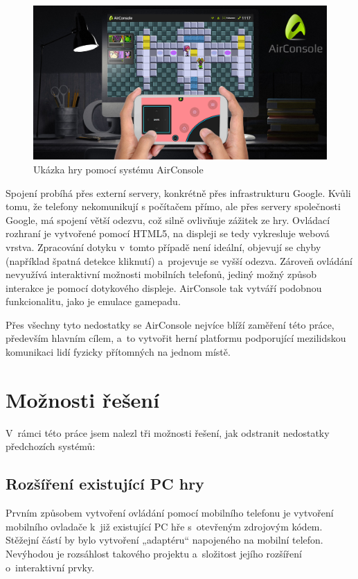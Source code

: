 \documentclass[thesis=B,czech,hidelinks]{FITthesis}[2012/06/26] %
\begin{document}
\begin{figure}[h]
\includegraphics[width=\textwidth]{airconsole}
\caption{Ukázka hry pomocí systému AirConsole\cite{airconsole}}
\end{figure}

Spojení probíhá přes externí servery, konkrétně přes infrastrukturu Google\cite{airconsole}. Kvůli tomu, že telefony nekomunikují s počítačem přímo, ale přes servery společnosti Google, má spojení větší odezvu, což silně ovlivňuje zážitek ze hry. Ovládací rozhraní je vytvořené pomocí HTML5, na displeji se tedy vykresluje webová vrstva. Zpracování dotyku v~tomto případě není ideální, objevují se chyby (například špatná detekce kliknutí) a~projevuje se vyšší odezva. Zároveň ovládání nevyužívá interaktivní možnosti mobilních telefonů, jediný možný způsob interakce je pomocí dotykového displeje. AirConsole tak vytváří podobnou funkcionalitu, jako je emulace gamepadu.

Přes všechny tyto nedostatky se AirConsole nejvíce blíží zaměření této práce, především hlavním cílem, a~to vytvořit herní platformu podporující mezilidskou komunikaci lidí fyzicky přítomných na jednom místě.

\section{Možnosti řešení}

V~rámci této práce jsem nalezl tři možnosti řešení, jak odstranit nedostatky předchozích systémů:

\subsection{Rozšíření existující PC hry}

Prvním způsobem vytvoření ovládání pomocí mobilního telefonu je vytvoření mobilního ovladače k~již existující PC hře s~otevřeným zdrojovým kódem. Stěžejní částí by bylo vytvoření „adaptéru“ napojeného na mobilní telefon. Nevýhodou je rozsáhlost takového projektu a~složitost jejího rozšíření o~interaktivní prvky.
\end{document}
